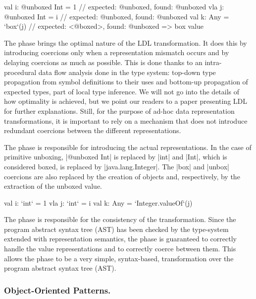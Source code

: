 \begin{lstlisting-nobreak}
val i: @unboxed Int = 1 // expected: @unboxed, found: @unboxed
vla j: @unboxed Int = i // expected: @unboxed, found: @unboxed
val k: Any = `box`(j)             // expected:  <@boxed>, found: @unboxed => box value
\end{lstlisting-nobreak}

The \coerce{} phase brings the optimal nature of the LDL transformation. It does this by introducing coercions only when a representation mismatch occurs and by delaying coercions as much as possible. This is done thanks to an intra-procedural data flow analysis done in the type system: top-down type propagation from symbol definitions to their uses and bottom-up propagation of expected types, part of local type inference. We will not go into the details of how optimality is achieved, but we point our readers to a paper presenting LDL \cite{ldl} for further explanations. Still, for the purpose of ad-hoc data representation transformations, it is important to rely on a mechanism that does not introduce redundant coercions between the different representations.

The \commit{} phase is responsible for introducing the actual representations. In the case of primitive unboxing, |@unboxed Int| is replaced by |int| and |Int|, which is considered boxed, is replaced by |java.lang.Integer|. The |box| and |unbox| coercions are also replaced by the creation of objects and, respectively, by the extraction of the unboxed value.

\begin{lstlisting-nobreak}
val i: `int` = 1
vla j: `int` = i
val k: Any = `Integer.valueOf`(j)
\end{lstlisting-nobreak}

The \commit{} phase is responsible for the consistency of the transformation. Since the program abstract syntax tree (AST) has been checked by the type-system extended with representation semantics, the \commit{} phase is guaranteed to correctly handle the value representations and to correctly coerce between them. This allows the \commit{} phase to be a very simple, syntax-based, transformation over the program abstract syntax tree (AST).

\subsubsection{Object-Oriented Patterns.}

